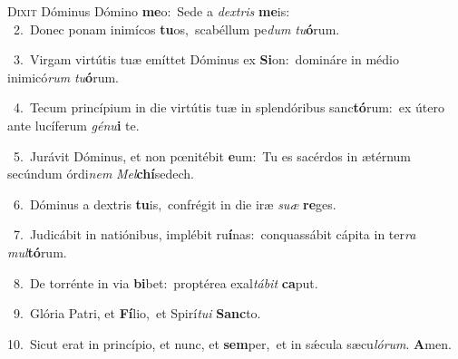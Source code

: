 \lettrine{\initial\textcolor{\initialcolor}{D}}{ixit} Dóminus Dómino \textbf{me}\-o:~\star Sede a \textit{dex}\-\textit{tris} \textbf{me}\-is:\\
{\numbfont\textcolor{\numbcolor}{~2.}}~Donec ponam inimícos \textbf{tu}\-os,~\star scabéllum pe\textit{dum} \textit{tu}\-\textbf{ó}rum.\par
{\numbfont\textcolor{\numbcolor}{~3.}}~Virgam virtútis tuæ emíttet Dóminus ex \textbf{Si}\-on:~\star domináre in médio inimicó\textit{rum} \textit{tu}\-\textbf{ó}rum.\par
{\numbfont\textcolor{\numbcolor}{~4.}}~Tecum princípium in die virtútis tuæ in splendóribus sanc\-\textbf{tó}\-rum:~\star ex útero ante lucíferum \textit{gé}\-\textit{nu}\textbf{i} te.\par
{\numbfont\textcolor{\numbcolor}{~5.}}~Jurávit Dóminus, et non pœnitébit \textbf{e}\-um:~\star Tu es sacérdos in ætérnum secúndum órdi\textit{nem} \textit{Mel}\-\textbf{chí}sedech.\par
{\numbfont\textcolor{\numbcolor}{~6.}}~Dóminus a dextris \textbf{tu}\-is,~\star confrégit in die iræ \textit{su}\-\textit{æ} \textbf{re}\-ges.\par
{\numbfont\textcolor{\numbcolor}{~7.}}~Judicábit in natiónibus, implébit ru\-\textbf{í}\-nas:~\star conquassábit cápita in ter\textit{ra} \textit{mul}\-\textbf{tó}rum.\par
{\numbfont\textcolor{\numbcolor}{~8.}}~De torrénte in via \textbf{bi}\-bet:~\star proptérea exal\-\textit{tá}\-\textit{bit} \textbf{ca}\-put.\par
{\numbfont\textcolor{\numbcolor}{~9.}}~Glória Patri, et \textbf{Fí}\-lio,~\star et Spirí\-\textit{tu}\-\textit{i} \textbf{Sanc}\-to.\par
{\numbfont\textcolor{\numbcolor}{10.}}~Sicut erat in princípio, et nunc, et \textbf{sem}\-per,~\star et in sǽcula sæcu\-\textit{ló}\-\textit{rum}. \textbf{A}\-men.\par

